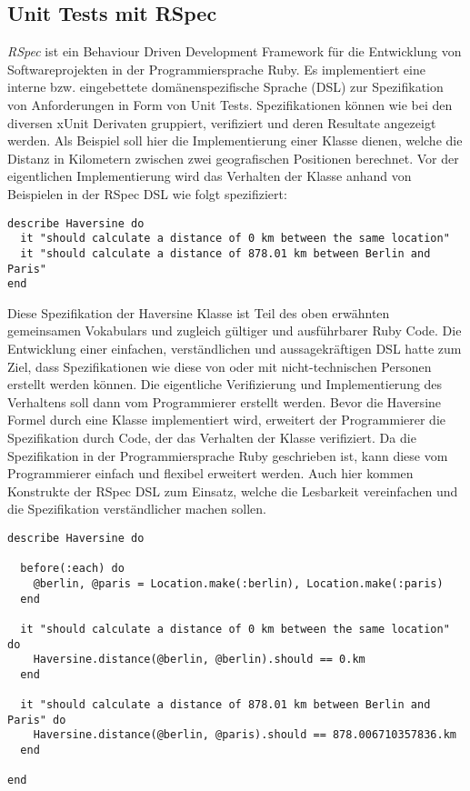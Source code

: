 \subsection{Unit Tests mit RSpec}

\textit{RSpec} \cite{rspec} ist ein Behaviour Driven Development
Framework für die Entwicklung von Softwareprojekten in der
Programmiersprache Ruby.  Es implementiert eine interne
bzw. eingebettete domänen\-spezifische Sprache (DSL) zur Spezifikation
von Anforderungen in Form von Unit Tests.  Spezifikationen können wie
bei den diversen xUnit Derivaten gruppiert, verifiziert und deren
Resultate angezeigt werden. Als Beispiel soll hier die Implementierung
einer Klasse dienen, welche die Distanz in Kilometern zwischen zwei
geografischen Positionen berechnet. Vor der eigentlichen
Implementierung wird das Verhalten der Klasse anhand von Beispielen in
der RSpec DSL wie folgt spezifiziert:

{\footnotesize
\begin{verbatim}
describe Haversine do
  it "should calculate a distance of 0 km between the same location"
  it "should calculate a distance of 878.01 km between Berlin and Paris"
end
\end{verbatim}
}

Diese Spezifikation der Haversine Klasse ist Teil des oben erwähnten
gemeinsamen Vokabulars und zugleich gültiger und ausführbarer Ruby
Code. Die Entwicklung einer einfachen, verständlichen und
aussagekräftigen DSL hatte zum Ziel, dass Spezifikationen wie diese
von oder mit nicht-technischen Personen erstellt werden können. Die
eigentliche Verifizierung und Implementierung des Verhaltens soll dann
vom Programmierer erstellt werden. Bevor die Haversine Formel durch
eine Klasse implementiert wird, erweitert der Programmierer die
Spezifikation durch Code, der das Verhalten der Klasse verifiziert. Da
die Spezifikation in der Programmiersprache Ruby geschrieben ist, kann
diese vom Programmierer einfach und flexibel erweitert werden. Auch
hier kommen Konstrukte der RSpec DSL zum Einsatz, welche die
Lesbarkeit vereinfachen und die Spezifikation verständlicher machen
sollen.

{\footnotesize
\begin{verbatim}
describe Haversine do

  before(:each) do
    @berlin, @paris = Location.make(:berlin), Location.make(:paris)
  end

  it "should calculate a distance of 0 km between the same location" do
    Haversine.distance(@berlin, @berlin).should == 0.km
  end

  it "should calculate a distance of 878.01 km between Berlin and Paris" do
    Haversine.distance(@berlin, @paris).should == 878.006710357836.km
  end

end
\end{verbatim}
}

